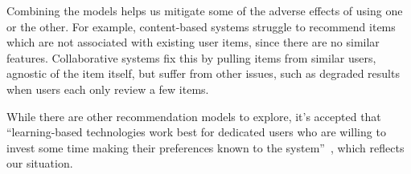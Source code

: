 Combining the models helps us mitigate some of the adverse effects of using one or the other. For example, content-based systems struggle to recommend items which are not associated with existing user items, since there are no similar features. Collaborative systems fix this by pulling items from similar users, agnostic of the item itself, but suffer from other issues, such as degraded results when users each only review a few items.

While there are other recommendation models to explore, it's accepted that ``learning-based technologies work best for dedicated users who are willing to invest some time making their preferences known to the system''~\cite{Burke2002}, which reflects our situation.
